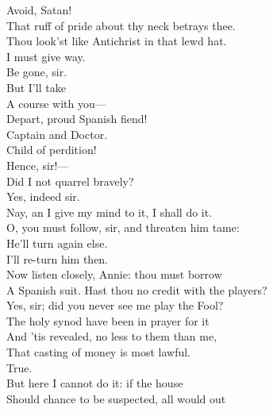 \documentclass[a4paper,oneside,12pt]{memoir}
\begin{document}
\begin{drama*}
\persecutionspeaks {} Avoid, Satan!\\
That ruff of pride about thy neck betrays thee.\\
Thou look'st like Antichrist in that lewd hat.\\
\surlyspeaks I must give way.\\
\kastrilspeaks {} Be gone, sir.\\
\surlyspeaks {} But I'll take\\
A course with you---\\
\persecutionspeaks {} Depart, proud Spanish fiend!\\
\surlyspeaks Captain and Doctor.\\
\persecutionspeaks {} Child of perdition!\\
\kastrilspeaks Hence, sir!---\\
 Did I not quarrel bravely?\\
\facespeaks {} Yes, indeed sir.\\
\kastrilspeaks Nay, an I give my mind to it, I shall do it.\\
\facespeaks O, you must follow, sir, and threaten him tame:\\
He'll turn again else.\\
\kastrilspeaks {} I'll re-turn him then.\\
\facespeaks Now listen closely, Annie: thou must borrow\\
A Spanish suit. Hast thou no credit with the players?\\
\druggerspeaks Yes, sir; did you never see me play the Fool?\\
\persecutionspeaks The holy synod have been in prayer for it\\
And 'tis revealed, no less to them than me,\\
That casting of money is most lawful.\\
\subtlespeaks {} True.\\
But here I cannot do it: if the house\\
Should chance to be suspected, all would out\\

\end{drama*}
\end{document}
